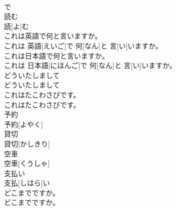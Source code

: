 \documentclass[8pt]{extreport}
\begin{document}
\begin{CJK}{UTF8}{min}
\\	で
\\	読む	
\\	読[よ]む
\\	これは英語で何と言いますか。	
\\	これは 英語[えいご]で 何[なん]と 言[い]いますか。
\\	これは日本語で何と言いますか。	
\\	これは 日本語[にほんご]で 何[なん]と 言[い]いますか。
\\	どういたしまして	
\\	どういたしまして
\\	これはたこわさびです。	
\\	これはたこわさびです。
\\	予約	
\\	予約[よやく]
\\	貸切	
\\	貸切[かしきり]
\\	空車	
\\	空車[くうしゃ]
\\	支払い	
\\	支払[しはら]い
\\	どこまでですか。	
\\	どこまでですか。
\end{CJK}
\end{document}
